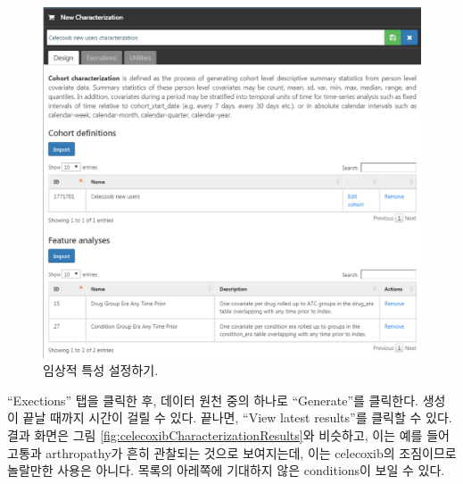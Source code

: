 \documentclass[11pt]{book}
\theoremstyle{definition}
\theoremstyle{definition}
\theoremstyle{definition}
\theoremstyle{remark}
\begin{document}
\begin{figure}

{\centering \includegraphics[width=1\linewidth]{images/SuggestedAnswers/celecoxibCharacterization} 

}

\caption{임상적 특성 설정하기.}\label{fig:celecoxibCharacterization}
\end{figure}

``Exections'' 탭을 클릭한 후, 데이터 원천 중의 하나로 ``Generate''를
클릭한다. 생성이 끝날 때까지 시간이 걸릴 수 있다. 끝나면, ``View latest
results''를 클릭할 수 있다. 결과 화면은 그림
\ref{fig:celecoxibCharacterizationResults}와 비슷하고, 이는 예를 들어
고통과 arthropathy가 흔히 관찰되는 것으로 보여지는데, 이는 celecoxib의
조짐이므로 놀랄만한 사용은 아니다. 목록의 아레쪽에 기대하지 않은
conditions이 보일 수 있다.
\end{document}
